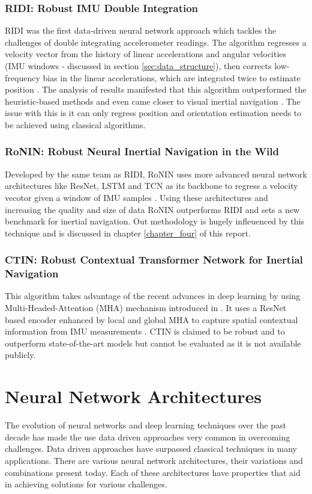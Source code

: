 \subsubsection{RIDI: Robust IMU Double Integration}
RIDI was the first data-driven neural network approach which tackles the challenges of double integrating accelerometer readings. The algorithm regresses a velocity vector from the history of linear accelerations and angular velocities (IMU windows - discussed in section \ref{sec:data_structure}), then corrects low-frequency bias in the linear accelerations, which are integrated twice to estimate position \citep{yan2018ridi}. The analysis of results manifested that this algorithm outperformed the heuristic-based methods and even came closer to visual inertial navigation \citep{yan2018ridi}. The issue with this is it can only regress position and orientation estimation needs to be achieved using classical algorithms.

\subsubsection{RoNIN: Robust Neural Inertial Navigation in the Wild}
Developed by the same team as RIDI, RoNIN uses more advanced neural network architectures like ResNet, LSTM and TCN as its backbone to regress a velocity vecotor given a window of IMU samples \citep{herath2020ronin}. Using these architectures and increasing the quality and size of data RoNIN outperforms RIDI and sets a new benchmark for inertial navigation. Out methodology is hugely infleuenced by this technique and is discussed in chapter \ref{chapter_four} of this report.
\subsubsection{CTIN: Robust Contextual Transformer Network for Inertial Navigation}
This algorithm takes advantage of the recent advances in deep learning by using Multi-Headed-Attention (MHA) mechanism introduced in \citep{vaswani2017attention}. It uses a ResNet based encoder enhanced by local and global MHA to capture spatial contextual information from IMU measurements \citep{rao2022ctin}. CTIN is claimed to be robust and to outperform state-of-the-art models but cannot be evaluated as it is not available publicly.

\section{Neural Network Architectures}
The evolution of neural networks and deep learning techniques over the past decade has made the use data driven approaches very common in overcoming challenges. Data driven approaches have surpassed classical techniques in many applications. There are various neural network architectures, their variations and combinations present today. Each of these architectures have properties that aid in achieving solutions for various challenges.

